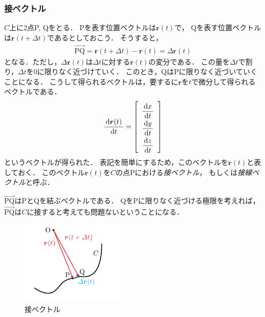 \subsubsection{接ベクトル}
$C$上に2点P, Qをとる．
Pを表す位置ベクトルは$\bm{r}(t)$で，
Qを表す位置ベクトルは$\bm{r} (t + \varDelta t)$であるとしておこう．
そうすると，
\begin{align*}
\overrightarrow{\mathrm{PQ}} = \bm{r} (t + \varDelta t) - \bm{r} (t) = \varDelta \bm{r} (t)
\end{align*}
となる．ただし，$\varDelta \bm{r} (t)$は$\varDelta t$に対する$\bm{r}(t)$の変分である．
この量を$\varDelta t$で割り，$\varDelta t$を0に限りなく近づけていく．
このとき，QはPに限りなく近づいていくことになる．
こうして得られるベクトルは，要するに$\bm{r}$を$t$で微分して得られるベクトルである．
\begin{align}
\frac{\mathrm{d} \bm{r}(t) } {\mathrm{d} t} = \left[
\renewcommand{\arraystretch}{2}
\begin{array}{c} 
\displaystyle \frac{ \mathrm{d} x} { \mathrm{d} t} \\
\displaystyle \frac{ \mathrm{d} y} { \mathrm{d} t} \\
\displaystyle \frac{ \mathrm{d} z} { \mathrm{d} t} 
\end{array}
\right]
\end{align}
というベクトルが得られた．
表記を簡単にするため，このベクトルを$\dot{\bm{r}}(t)$と表しておく．
このベクトル$\dot{\bm{r}}(t)$を$C$の点Pにおける\emph{接ベクトル}，
もしくは\emph{接線ベクトル}と呼ぶ．

$\overrightarrow{\mathrm{PQ}}$はPとQを結ぶベクトルである．
QをPに限りなく近づける極限を考えれば，
$\overrightarrow{\mathrm{PQ}}$は$C$に接すると考えても問題ないということになる．

\begin{figure}[h]
 \begin{center}
 \includegraphics[width=5cm]{picture/vecterana3}
 \caption{接ベクトル}
\label{fig:setuvec}
 \end{center}
\end{figure}

